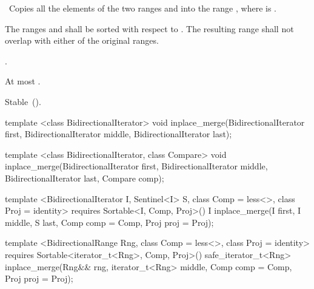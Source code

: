 \begin{itemdescr}
\pnum
\effects\ Copies all the elements of the two ranges  and
 into the range , where 
is .

\pnum
\requires The ranges  and  shall be
sorted with respect to  .
The resulting range shall not overlap with either of the original ranges.

\pnum
\returns
{}
.

\pnum
\complexity
At most
.

\pnum
\remarks Stable~().
\end{itemdescr}

%
\begin{removedblock}
\begin{itemdecl}
template <class BidirectionalIterator>
  void inplace_merge(BidirectionalIterator first,
                     BidirectionalIterator middle,
                     BidirectionalIterator last);

template <class BidirectionalIterator, class Compare>
  void inplace_merge(BidirectionalIterator first,
                     BidirectionalIterator middle,
                     BidirectionalIterator last, Compare comp);
\end{itemdecl}
\end{removedblock}
\begin{addedblock}
\begin{itemdecl}
template <BidirectionalIterator I, Sentinel<I> S, class Comp = less<>,
    class Proj = identity>
  requires Sortable<I, Comp, Proj>()
  I
    inplace_merge(I first, I middle, S last, Comp comp = Comp{}, Proj proj = Proj{});

template <BidirectionalRange Rng, class Comp = less<>, class Proj = identity>
  requires Sortable<iterator_t<Rng>, Comp, Proj>()
  safe_iterator_t<Rng>
    inplace_merge(Rng&& rng, iterator_t<Rng> middle, Comp comp = Comp{},
                  Proj proj = Proj{});
\end{itemdecl}
\end{addedblock}

